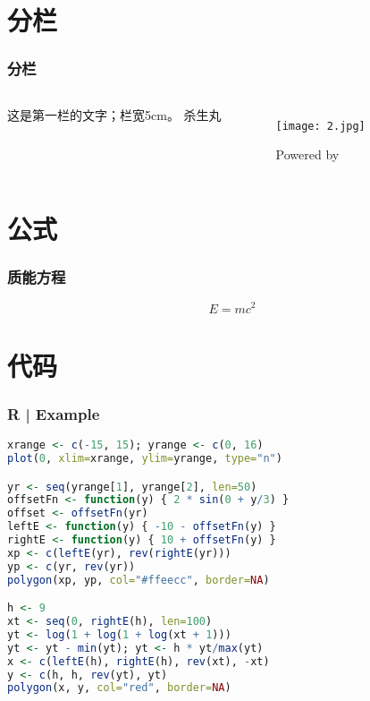 \documentclass[UTF8,table]{ctexbeamer}
\begin{document}
\section{分栏}
\begin{frame}
	\frametitle{分栏}
	\begin{columns}
		\column{2cm}
		这是第一栏的文字；栏宽5cm。
		\column{8cm}
		\centering 杀生丸
			\begin{figure}[htbp]
				\centering
				\texttt{[image: 2.jpg]}
				\caption{Powered by}
				\label{fig:power}
			\end{figure}
	\end{columns}
\end{frame}

\section{公式}
\begin{frame}
	\frametitle{质能方程}
	\begin{equation}
		E=mc^2
		\label{emc}
	\end{equation}
\end{frame}

\begin{frame}
\end{frame}

\section{代码}
\begin{frame}[fragile]
\frametitle{R | Example}
\begin{lstlisting}[language=R,basicstyle=\footnotesize\tt]
xrange <- c(-15, 15); yrange <- c(0, 16)
plot(0, xlim=xrange, ylim=yrange, type="n")

yr <- seq(yrange[1], yrange[2], len=50)
offsetFn <- function(y) { 2 * sin(0 + y/3) }
offset <- offsetFn(yr)
leftE <- function(y) { -10 - offsetFn(y) }
rightE <- function(y) { 10 + offsetFn(y) }
xp <- c(leftE(yr), rev(rightE(yr)))
yp <- c(yr, rev(yr))
polygon(xp, yp, col="#ffeecc", border=NA)

h <- 9
xt <- seq(0, rightE(h), len=100)
yt <- log(1 + log(1 + log(xt + 1)))
yt <- yt - min(yt); yt <- h * yt/max(yt)
x <- c(leftE(h), rightE(h), rev(xt), -xt)
y <- c(h, h, rev(yt), yt)
polygon(x, y, col="red", border=NA)
\end{lstlisting}	
\end{frame}

\begin{frame}
\end{frame}
\end{document}
